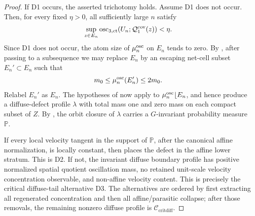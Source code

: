 \documentclass[11pt]{amsart}
\numberwithin{equation}{section}
\theoremstyle{plain}
\theoremstyle{definition}
\theoremstyle{remark}
\newcommand{\Ccritdiff}{\mathcal C_{\mathrm{critdiff}}}
\newcommand{\actthree}{\operatorname{osc}_{3,\mathrm{ct}}}
\begin{document}
\begin{proof}
If D1 occurs, the asserted trichotomy holds.  Assume D1 does not occur.  Then, for
every fixed \(\eta>0\), all sufficiently large \(n\) satisfy
\[
   \sup_{z\in E_n}
      \actthree(U_n;\mathcal Q_1^{\rm cov}(z))<\eta .
\]
Since D1 does not occur, the atom size of \(\mu_n^{\rm osc}\) on \(E_n\)
tends to zero.  By , after passing to
a subsequence we may replace \(E_n\) by an escaping net-cell subset
\(E_n'\subset E_n\) such that
\[
   m_0\le \mu_n^{\rm osc}(E_n')\le 2m_0 .
\]
Relabel \(E_n'\) as \(E_n\).  The hypotheses of
 now apply to
\(\mu_n^{\rm osc}\lfloor E_n\), and hence produce a diffuse-defect profile
\(\lambda\) with total mass one and zero mass on each compact subset of \(Z\).
By , the orbit closure of
\(\lambda\) carries a \(G\)-invariant probability measure \(\mathbb P\).

If every local velocity tangent in the support of \(\mathbb P\), after the
canonical affine normalization, is locally constant, then
 places the defect in the affine
lower stratum.  This is D2.  If not, the invariant diffuse boundary profile has
positive normalized spatial quotient oscillation mass, no retained unit-scale
velocity concentration observable, and non-affine velocity content.  This is precisely the critical diffuse-tail
alternative D3.  The alternatives are ordered by first extracting all regenerated
concentration and then all affine/parasitic collapse; after those removals, the
remaining nonzero diffuse profile is \(\Ccritdiff\).
\end{proof}
\end{document}

